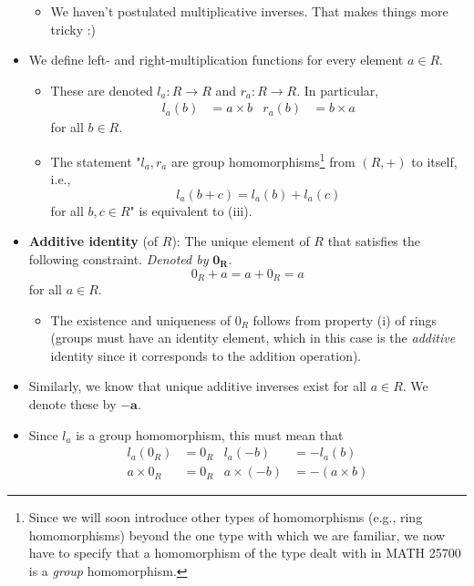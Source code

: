 \documentclass[../notes.tex]{subfiles}
\begin{document}
\begin{itemize}
\begin{itemize}
        \item We haven't postulated multiplicative inverses. That makes things more tricky :)
    \end{itemize}
    \item We define left- and right-multiplication functions for every element $a\in R$.
    \begin{itemize}
        \item These are denoted $l_a:R\to R$ and $r_a:R\to R$. In particular,
        \begin{align*}
            l_a(b) &= a\times b&
            r_a(b) &= b\times a
        \end{align*}
        for all $b\in R$.
        \item The statement "$l_a,r_a$ are group homomorphisms\footnote{Since we will soon introduce other types of homomorphisms (e.g., ring homomorphisms) beyond the one type with which we are familiar, we now have to specify that a homomorphism of the type dealt with in MATH 25700 is a \emph{group} homomorphism.} from $(R,+)$ to itself, i.e.,
        \begin{equation*}
            l_a(b+c) = l_a(b)+l_a(c)
        \end{equation*}
        for all $b,c\in R$" is equivalent to (iii).
    \end{itemize}
    \item \textbf{Additive identity} (of $R$): The unique element of $R$ that satisfies the following constraint. \emph{Denoted by} $\bm{0_R}$.
    \begin{equation*}
        0_R+a = a+0_R = a
    \end{equation*}
    for all $a\in R$.
    \begin{itemize}
        \item The existence and uniqueness of $0_R$ follows from property (i) of rings (groups must have an identity element, which in this case is the \emph{additive} identity since it corresponds to the addition operation).
    \end{itemize}
    \item Similarly, we know that unique additive inverses exist for all $a\in R$. We denote these by $\bm{-a}$.
    \item Since $l_a$ is a group homomorphism, this must mean that
    \begin{align*}
        l_a(0_R) &= 0_R&
            l_a(-b) &= -l_a(b)\\
        a\times 0_R &= 0_R&
            a\times(-b) &= -(a\times b)

\end{align*}
\end{itemize}
\end{document}
